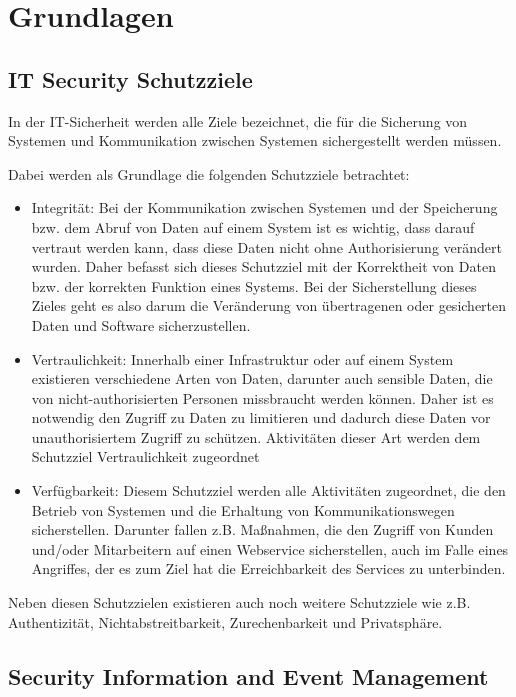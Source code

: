 \chapter{Grundlagen}
\label{cha:grundlagen}


\section{IT Security Schutzziele}
\label{cha:IT Security Schutzziele}

In der IT-Sicherheit werden alle Ziele bezeichnet, die für die Sicherung von Systemen und Kommunikation zwischen Systemen sichergestellt werden müssen.

Dabei werden als Grundlage die folgenden Schutzziele betrachtet:
\begin{itemize}
\item Integrität: Bei der Kommunikation zwischen Systemen und der Speicherung bzw. dem Abruf von Daten auf einem System ist es wichtig, dass darauf vertraut werden kann, dass diese Daten nicht ohne Authorisierung verändert wurden. Daher befasst sich dieses Schutzziel mit der Korrektheit von Daten bzw. der korrekten Funktion eines Systems. Bei der Sicherstellung dieses Zieles geht es also darum die Veränderung von übertragenen oder gesicherten Daten und Software sicherzustellen.
\item Vertraulichkeit: Innerhalb einer Infrastruktur oder auf einem System existieren verschiedene Arten von Daten, darunter auch sensible Daten,  die von nicht-authorisierten Personen missbraucht werden können. Daher ist es notwendig den Zugriff zu Daten zu limitieren und dadurch diese Daten vor unauthorisiertem Zugriff zu schützen. Aktivitäten dieser Art werden dem Schutzziel Vertraulichkeit zugeordnet
\item Verfügbarkeit: Diesem Schutzziel werden alle Aktivitäten zugeordnet, die den Betrieb von Systemen und die Erhaltung von Kommunikationswegen sicherstellen. Darunter fallen z.B. Maßnahmen, die den Zugriff von Kunden und/oder Mitarbeitern auf einen Webservice sicherstellen, auch im Falle eines Angriffes, der es zum Ziel hat die Erreichbarkeit des Services zu unterbinden.
\end{itemize}
Neben diesen Schutzzielen existieren auch noch weitere Schutzziele wie z.B. Authentizität, Nichtabstreitbarkeit, Zurechenbarkeit und Privatsphäre.


\section{Security Information and Event Management}
\label{cha:Security Information and Event Management}

